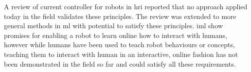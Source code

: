A review of current controller for robots in \gls{hri} reported that no approach applied today in the field validates these principles. The review was extended to more general methods in \acrlong{ml} with potential to satisfy these principles. \acrlong{iml} show promises for enabling a robot to learn online how to interact with humans, however while humans have been used to teach robot behaviours or concepts, teaching them to interact with human in an interactive, online fashion has not been demonstrated in the field so far and could satisfy all these requirements.